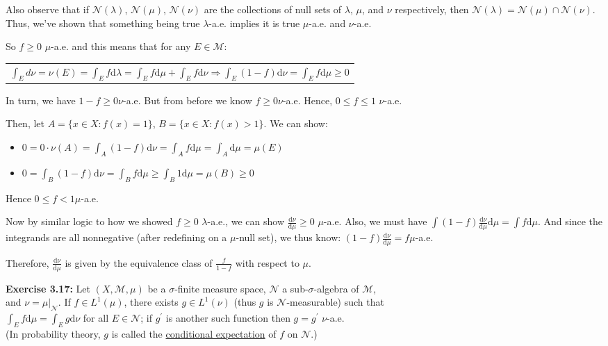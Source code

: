 \documentclass{book}
\newenvironment{myIndent}{%
   \begin{adjustwidth}{2.5em}{0em}%
}{%
   \end{adjustwidth}%
}
\newcommand{\udefine}[1]{{%
   \setulcolor{Red}%
   \setul{0.14em}{0.07em}%
   \ul{#1}%
}}
\newcommand{\blab}[1]{\textbf{#1}}
\newcommand{\df}{\mathrm{d}}
\newcommand{\retTwo}{\hfill\bigbreak}
\begin{document}
\begin{myIndent}
	Also observe that if $\mathcal{N}(\lambda)$, $\mathcal{N}(\mu)$, $\mathcal{N}(\nu)$ are the collections of null sets of $\lambda$, $\mu$, and $\nu$ respectively, then $\mathcal{N}(\lambda) = \mathcal{N}(\mu) \cap \mathcal{N}(\nu)$. Thus, we've shown that something being true $\lambda$-a.e. implies it is true $\mu$-a.e. and $\nu$-a.e.\retTwo

	So $f \geq 0$ $\mu$-a.e. and this means that for any $E \in \mathcal{M}$:

	{\centering\begin{tabular}{l}
		$\int_E d\nu = \nu(E) = \int_E f\df\lambda = \int_E f \df\mu + \int_E f \df\nu \Longrightarrow \int_E(1 - f)\df\nu = \int_E f \df\mu \geq 0$
	\end{tabular}\retTwo\par}

	In turn, we have $1 - f \geq 0$\phantom{..}$\nu$-a.e. But from before we know $f \geq 0$\phantom{..}$\nu$-a.e. Hence, $0 \leq f \leq 1$ $\nu$-a.e.\retTwo

	Then, let $A = \{x \in X : f(x) = 1\}$, $B = \{x \in X : f(x) > 1\}$. We can show:
	\begin{itemize}
		\item $0 = 0 \cdot \nu(A) = \int_A(1 - f)\df\nu = \int_A f\df \mu = \int_A \df\mu = \mu(E)$
		\item $0 = \int_B (1-f)\df\nu = \int_B f \df \mu \geq \int_B 1\df\mu = \mu(B) \geq 0$\\
	\end{itemize}

	Hence $0 \leq f < 1$\phantom{..}$\mu$-a.e.\retTwo

	Now by similar logic to how we showed $f \geq 0$ $\lambda$-a.e., we can show $\frac{\df \nu}{\df \mu} \geq 0$ $\mu$-a.e. Also, we must have $\int (1 - f)\frac{\df \nu}{\df \mu}\df \mu = \int f \df \mu$. And since the integrands are all nonnegative (after redefining on a $\mu$-null set), we thus know: $(1 - f)\frac{\df \nu}{\df \mu} = f$\phantom{..}$\mu$-a.e.\retTwo

	Therefore, $\frac{\df \nu}{\df \mu}$ is given by the equivalence class of $\frac{f}{1 - f}$ with respect to $\mu$.\retTwo
\end{myIndent}

\blab{Exercise 3.17:} Let $(X, \mathcal{M}, \mu)$ be a $\sigma$-finite measure space, $\mathcal{N}$ a sub-$\sigma$-algebra of $\mathcal{M}$,\\ and $\nu = \mu|_{\mathcal{N}}$. If $f \in L^1(\mu)$, there exists $g \in L^1(\nu)$ (thus $g$ is $\mathcal{N}$-measurable) such that\\ $\int_E f\df\mu = \int_E g \df\nu$ for all $E \in \mathcal{N}$; if $g^\prime$ is another such function then $g = g^\prime$ $\nu$-a.e.\\ (In probability theory, $g$ is called the \udefine{conditional expectation} of $f$ on $\mathcal{N}$.)\\ [-8pt]
\end{document}

